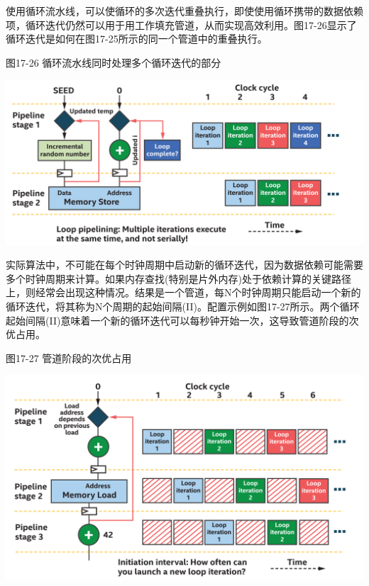 使用循环流水线，可以使循环的多次迭代重叠执行，即使使用循环携带的数据依赖项，循环迭代仍然可以用于用工作填充管道，从而实现高效利用。图17-26显示了循环迭代是如何在图17-25所示的同一个管道中的重叠执行。\par

\hspace*{\fill} \par %
图17-26 循环流水线同时处理多个循环迭代的部分
\begin{center}
	\includegraphics[width=1.0\textwidth]{content/chapter-17/images/21}
\end{center}

实际算法中，不可能在每个时钟周期中启动新的循环迭代，因为数据依赖可能需要多个时钟周期来计算。如果内存查找(特别是片外内存)处于依赖计算的关键路径上，则经常会出现这种情况。结果是一个管道，每N个时钟周期只能启动一个新的循环迭代，将其称为N个周期的起始间隔(II)。配置示例如图17-27所示。两个循环起始间隔(II)意味着一个新的循环迭代可以每秒钟开始一次，这导致管道阶段的次优占用。\par

\hspace*{\fill} \par %
图17-27 管道阶段的次优占用
\begin{center}
	\includegraphics[width=1.0\textwidth]{content/chapter-17/images/22}
\end{center}

